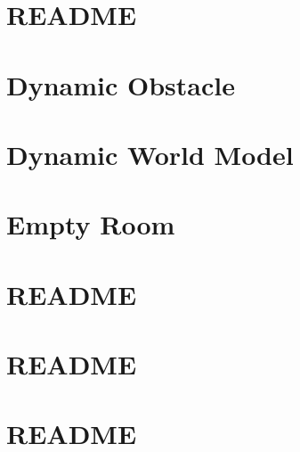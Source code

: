 \let\mypdfximage\pdfximage\def\pdfximage{\immediate\mypdfximage}\documentclass[twoside]{book}
\newcommand{\+}{\discretionary{\mbox{\scriptsize$\hookleftarrow$}}{}{}}
\begin{document}
\chapter{README}
\label{md_smacc2_sm_reference_library_sm_dance_bot_README}

\chapter{Dynamic Obstacle}
\label{md_smacc2_sm_reference_library_sm_dance_bot_strikes_back_models_dynamic_obstacle_README}

\chapter{Dynamic World Model}
\label{md_smacc2_sm_reference_library_sm_dance_bot_strikes_back_models_dynamic_world_README}

\chapter{Empty Room}
\label{md_smacc2_sm_reference_library_sm_dance_bot_strikes_back_models_empty_room_README}

\chapter{README}
\label{md_smacc2_sm_reference_library_sm_dance_bot_strikes_back_README}

\chapter{README}
\label{md_smacc2_sm_reference_library_sm_multi_stage_1_README}

\chapter{README}
\label{md_smacc2_sm_reference_library_sm_pubsub_1_README}

\end{document}
